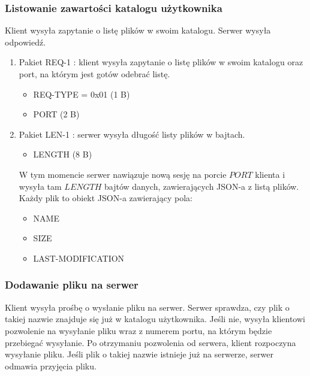 \documentclass{article}
\begin{document}
	\subsubsection{Listowanie zawartości katalogu użytkownika}
	Klient wysyła zapytanie o listę plików w swoim katalogu. Serwer wysyła odpowiedź. 
	
	\begin{enumerate}
		\item Pakiet REQ-1 \label{REQ-1}: klient wysyła zapytanie o listę plików w swoim katalogu oraz port, na którym jest gotów odebrać listę. 
		\begin{itemize}
			\item REQ-TYPE = 0x01 (1 B)
			\item PORT (2 B)
		\end{itemize}
	
		\item Pakiet LEN-1 \label{LEN-1}: serwer wysyła długość listy plików w bajtach. 
		\begin{itemize}
			\item LENGTH (8 B)
		\end{itemize}
	
		W tym momencie serwer nawiązuje nową sesję na porcie $PORT$ klienta i wysyła tam $LENGTH$ bajtów danych, zawierających JSON-a z listą plików. Każdy plik to obiekt JSON-a zawierający pola:
		\begin{itemize}
			\item NAME
			\item SIZE
			\item LAST-MODIFICATION
		\end{itemize}
		
	\end{enumerate}

	\subsubsection{Dodawanie pliku na serwer}
	Klient wysyła prośbę o wysłanie pliku na serwer. Serwer sprawdza, czy plik o takiej nazwie znajduje się już w katalogu użytkownika. Jeśli nie, wysyła klientowi pozwolenie na wysyłanie pliku wraz z numerem portu, na którym będzie przebiegać wysyłanie. Po otrzymaniu pozwolenia od serwera, klient rozpoczyna wysyłanie pliku. 
	Jeśli plik o takiej nazwie istnieje już na serwerze, serwer odmawia przyjęcia pliku. 
	
\end{document}
